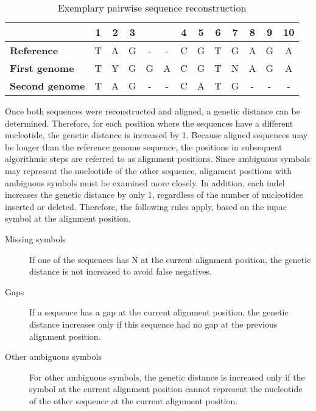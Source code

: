 \begin{table}[ht!]
    \caption{Exemplary pairwise sequence reconstruction}
    \centering
    \begin{tabular}{ l | c c c c c c c c c c c c } 
    & \textbf{1} & \textbf{2} & \textbf{3} & & & \textbf{4} & \textbf{5} & \textbf{6} & \textbf{7} & \textbf{8} & \textbf{9} & \textbf{10}\\
    \hline
    \textbf{Reference} & T & A & G & - & - & C & G & T & G & A & G & A \\
    \hline
    \textbf{First genome} & T & Y & G & G & A & C & G & T & N & A & G & A \\
    \hline
    \textbf{Second genome} & T & A & G & - & - & C & A & T & G & - & - & -\\
    \end{tabular}
    \label{table:exemplary_aligned_sequence_reconstruction_result}
\end{table}

Once both sequences were reconstructed and aligned, a genetic distance can be determined. Therefore, for each position where the sequences have a different nucleotide, the genetic distance is increased by 1. Because aligned sequences may be longer than the reference genome sequence, the positions in subsequent algorithmic steps are referred to as alignment positions. Since ambiguous symbols may represent the nucleotide of the other sequence, alignment positions with ambiguous symbols must be examined more closely. In addition, each indel increases the genetic distance by only 1, regardless of the number of nucleotides inserted or deleted. Therefore, the following rules apply, based on the \acrshort{iupac} symbol at the alignment position.

\begin{description}
  \item[Missing symbols] If one of the sequences has N at the current alignment position, the genetic distance is not increased to avoid false negatives.
  \item[Gaps] If a sequence has a gap at the current alignment position, the genetic distance increases only if this sequence had no gap at the previous alignment position.
  \item[Other ambiguous symbols] For other ambiguous symbols, the genetic distance is increased only if the symbol at the current alignment position cannot represent the nucleotide of the other sequence at the current alignment position.
\end{description}

